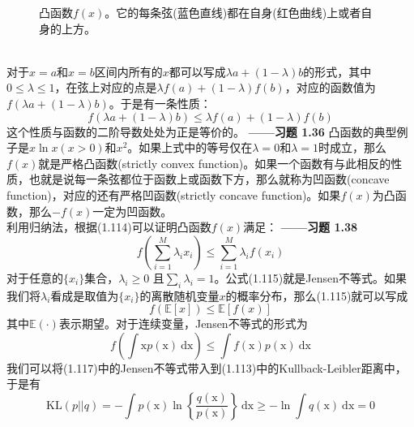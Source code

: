 \documentclass[b5paper]{book}
\numberwithin{equation}{chapter}
\begin{document}
{\begin{figure}[ht]
		\caption{凸函数$f(x)$。它的每条弦(蓝色直线)都在自身(红色曲线)上或者自身的上方。}
		\label{fig:1-31}
	\end{figure}
	\\
	\indent 对于$x=a$和$x=b$区间内所有的$x$都可以写成$\lambda a + (1-\lambda) b$的形式，其中$0 \leqslant \lambda \leqslant 1$，在弦上对应的点是$\lambda f(a) + (1-\lambda) f(b)$，对应的函数值为$f(\lambda a + (1-\lambda)b)$。于是有一条性质：
	\begin{equation}
		f(\lambda a + (1-\lambda)b) \leqslant \lambda f(a) + (1-\lambda)f(b)
	\end{equation}
	这个性质与函数的二阶导数处处为正是等价的。\color{red} \textbf{——习题 1.36} \color{black}凸函数的典型例子是$x\ln x (x>0)$和$x^2$。如果上式中的等号仅在$\lambda=0$和$\lambda=1$时成立，那么$f(x)$就是严格凸函数(strictly convex function)。如果一个函数有与此相反的性质，也就是说每一条弦都位于函数上或函数下方，那么就称为凹函数(concave function)，对应的还有严格凹函数(strictly concave function)。如果$f(x)$为凸函数，那么$-f(x)$一定为凹函数。\\
	\indent 利用归纳法，根据(1.114)可以证明凸函数$f(x)$满足：\color{red} \textbf{——习题 1.38} \color{black}
	\begin{equation}
		f\left(\sum_{i=1}^M \lambda_i x_i\right) \leqslant \sum_{i=1}^M \lambda_i f(x_i)
	\end{equation}
	\indent 对于任意的$\{x_i\}$集合，$\lambda_i \geqslant 0$ 且$\sum_i \lambda_i =1$。公式(1.115)就是Jensen不等式。如果我们将$\lambda_i$看成是取值为$\{x_i\}$的离散随机变量$x$的概率分布，那么(1.115)就可以写成
	\begin{equation}
		f(\mathbb{E}[x])\leqslant \mathbb{E}[f(x)]
	\end{equation}
	其中$\mathbb{E}(\cdot)$表示期望。对于连续变量，Jensen不等式的形式为
	\begin{equation}
		f\left(\int \boldsymbol{\mathrm{x}}p(\boldsymbol{\mathrm{x}})\ \mathrm{d}\boldsymbol{\mathrm{x}}\right) \leqslant \int f(\boldsymbol{\mathrm{x}})p(\boldsymbol{\mathrm{x}})\ \mathrm{d}\boldsymbol{\mathrm{x}}
	\end{equation}
	\indent 我们可以将(1.117)中的Jensen不等式带入到(1.113)中的Kullback-Leibler距离中，于是有
	\begin{equation}
		\mathrm{KL}(p||q) = - \int p(\boldsymbol{\mathrm{x}}) \ln \left\{\frac{q(\boldsymbol{\mathrm{x}})}{p(\boldsymbol{\mathrm{x}})}\right\}\ \mathrm{d}\boldsymbol{\mathrm{x}} \geqslant - \ln \int q(\boldsymbol{\mathrm{x}})\ \mathrm{d}\boldsymbol{\mathrm{x}} = 0
	\end{equation}
}
\end{document}
